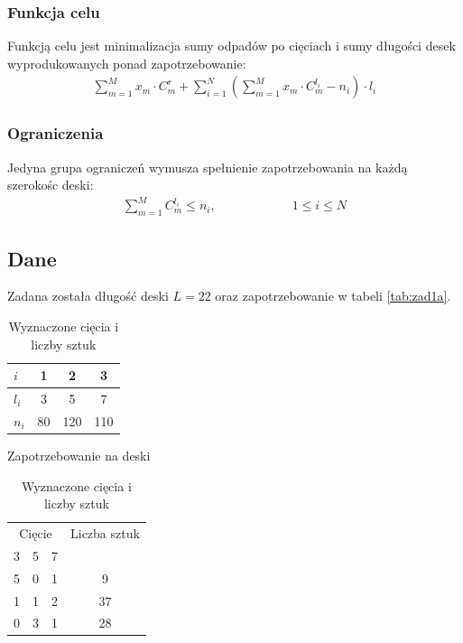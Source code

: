 \documentclass{article}
\begin{document}
\subsubsection{Funkcja celu}
Funkcją celu jest minimalizacja sumy odpadów po cięciach i sumy długości desek wyprodukowanych ponad zapotrzebowanie:
\begin{align*}
    \sum_{m=1}^{M} x_m \cdot C_m^r + \sum_{i=1}^{N} \left(\sum_{m=1}^{M} x_m \cdot C_m^{l_i} - n_i\right) \cdot l_i
\end{align*}

\subsubsection{Ograniczenia}
Jedyna grupa ograniczeń wymusza spełnienie zapotrzebowania na każdą szerokośc deski:
\begin{align*}
    \sum_{m=1}^M C_m^{l_i} \leq n_i, \qquad \qquad \qquad 1 \leq i \leq N
\end{align*}

\subsection{Dane}
Zadana została długość deski $L = 22$ oraz zapotrzebowanie w tabeli \ref{tab:zad1a}.
\begin{table}[h]
    \centering
    \begin{minipage}{0.45\textwidth}
        \centering
        \begin{tabular}{l|ccc}
            $i$ & 1 & 2 & 3 \\
            \hline
            $l_i$ & 3 & 5 & 7 \\
            \hline
            $n_i$ & 80 & 120 & 110 \\
        \end{tabular}
        \caption{Zapotrzebowanie na deski}
        \label{tab:zad1a}
    \end{minipage}
    \hfill
    \begin{minipage}{0.45\textwidth}
        \centering
        \begin{tabular}{ccc|c}
            \multicolumn{3}{c|}{Cięcie} & Liczba sztuk \\
            3 & 5 & 7 & \\
            \hline
            5 & 0 & 1 & 9 \\
            1 & 1 & 2 & 37 \\
            0 & 3 & 1 & 28 \\
        \end{tabular}
        \caption{Wyznaczone cięcia i liczby sztuk}
        \label{tab:zad1b}
    \end{minipage}
\end{table}
\end{document}
